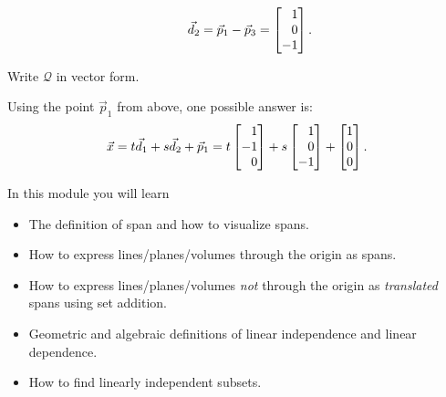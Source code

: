 \documentclass{workbook}
\begin{document}
\begin{slide}
\begin{parts}
\begin{solution}
\[					\qquad
					\vec d_2 = \vec p_1 - \vec p_3 = \mat{1\\0\\-1}.
				\]
			\end{solution}
		\item Write $\mathcal Q$ in vector form.
			\begin{solution}
				Using the point $\vec p_1$ from above, one possible answer is:
				\[
					\vec x = t\vec d_1 + s\vec d_2 + \vec p_1
					= t \mat{1\\-1\\0} + s \mat{1\\0\\-1} + \mat{1\\0\\0}.
				\]
			\end{solution}
	\end{parts}
\end{slide}

\begin{module}

	In this module you will learn
	\begin{itemize}
		\item The definition of span and how to visualize spans.
		\item How to express lines/planes/volumes through the origin as spans.
		\item How to express lines/planes/volumes \emph{not} through the origin as
			\emph{translated} spans using set addition.
		\item Geometric and algebraic definitions of linear independence and linear
			dependence.
		\item How to find linearly independent subsets.
	\end{itemize}

	
	
\end{module}
\end{document}
